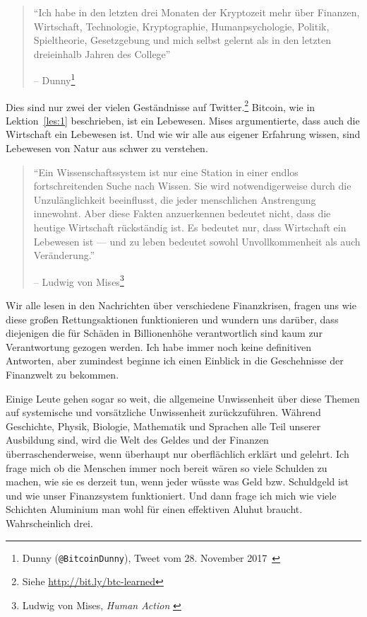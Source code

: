 \begin{quotation}\begin{samepage}
\enquote{Ich habe in den letzten drei Monaten der Kryptozeit mehr über Finanzen,
Wirtschaft, Technologie, Kryptographie, Humanpsychologie, Politik, Spieltheorie,
Gesetzgebung und mich selbst gelernt als in den letzten dreieinhalb Jahren des
College}
\begin{flushright} -- Dunny\footnote{Dunny (\texttt{@BitcoinDunny}), Tweet vom 28. November 2017~\cite{bitcoindunny-tweet}}
\end{flushright}\end{samepage}\end{quotation}

Dies sind nur zwei der vielen Geständnisse auf Twitter.\footnote{Siehe
\url{http://bit.ly/btc-learned}} Bitcoin, wie in Lektion~\ref{les:1}
beschrieben, ist ein Lebewesen. Mises argumentierte, dass auch die Wirtschaft
ein Lebewesen ist. Und wie wir alle aus eigener Erfahrung wissen, sind Lebewesen
von Natur aus schwer zu verstehen.

\begin{quotation}\begin{samepage}
\enquote{Ein Wissenschaftssystem ist nur eine Station in einer endlos
fortschreitenden Suche nach Wissen. Sie wird notwendigerweise durch die
Unzulänglichkeit beeinflusst, die jeder menschlichen Anstrengung innewohnt. Aber
diese Fakten anzuerkennen bedeutet nicht, dass die heutige Wirtschaft
rückständig ist. Es bedeutet nur, dass Wirtschaft ein Lebewesen ist — und zu
leben bedeutet sowohl Unvollkommenheit als auch Veränderung.}
\begin{flushright} -- Ludwig von Mises\footnote{Ludwig von Mises, \textit{Human Action}
\cite{human-action}}
\end{flushright}\end{samepage}\end{quotation}

Wir alle lesen in den Nachrichten über verschiedene Finanzkrisen, fragen uns wie
diese großen Rettungsaktionen funktionieren und wundern uns darüber, dass
diejenigen die für Schäden in Billionenhöhe verantwortlich sind kaum zur
Verantwortung gezogen werden. Ich habe immer noch keine definitiven Antworten,
aber zumindest beginne ich einen Einblick in die Geschehnisse der Finanzwelt zu
bekommen.

Einige Leute gehen sogar so weit, die allgemeine Unwissenheit über diese Themen
auf systemische und vorsätzliche Unwissenheit zurückzuführen. Während
Geschichte, Physik, Biologie, Mathematik und Sprachen alle Teil unserer
Ausbildung sind, wird die Welt des Geldes und der Finanzen überraschenderweise,
wenn überhaupt nur oberflächlich erklärt und gelehrt. Ich frage mich ob die
Menschen immer noch bereit wären so viele Schulden zu machen, wie sie es derzeit
tun, wenn jeder wüsste was Geld bzw. Schuldgeld ist und wie unser Finanzsystem
funktioniert. Und dann frage ich mich wie viele Schichten Aluminium man wohl für
einen effektiven Aluhut braucht. Wahrscheinlich drei.


